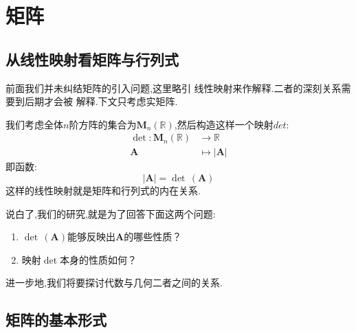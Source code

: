 \newpage
\chapter{矩阵}
\thispagestyle{fancy}
\setcounter{section}{0}
\section{从线性映射看矩阵与行列式}
前面我们并未纠结矩阵的引入问题,这里略引
线性映射来作解释.二者的深刻关系需要到后期才会被
解释.下文只考虑实矩阵.

我们考虑全体$n$阶方阵的集合为$
\bm{M}_n\left(\mathbb{R} 
\right)$,然后构造这样一个映射$det$:
\begin{align*}
   \det : \bm{M}_n\left(\mathbb{R} 
   \right)  & \longrightarrow 
\mathbb{R} \\
\bm{A} & \longmapsto 
\left|\bm{A}\right|
\end{align*}
即函数:
\[
\left|\bm{A}\right| =  \det\,\left(\bm{A}\right)
\]
这样的线性映射就是矩阵和行列式的内在关系.


说白了,我们的研究,就是为了回答下面这两个问题:
\begin{enumerate}[label =\textup{(\arabic*)}]
\item $\det\,\left(\bm{A}\right)$能够反映出$\bm{A}$的哪些性质？
\item 映射$\det$本身的性质如何？
\end{enumerate}

进一步地,我们将要探讨代数与几何二者之间的关系.
\newpage
\section{矩阵的基本形式}
